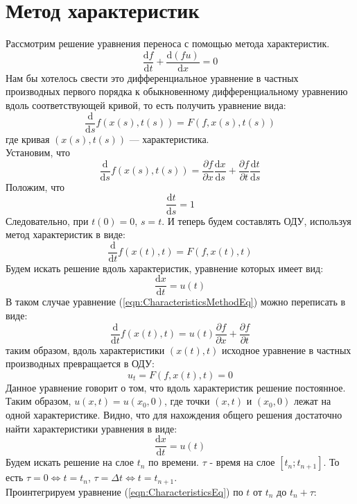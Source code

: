 \documentclass[10pt,a4paper]{article}
\begin{document}
\section{Метод характеристик}
\begin{comment}
https://ru.wikipedia.org/wiki/%
\end{comment}
Рассмотрим решение уравнения переноса с помощью метода характеристик.
\begin{equation}
\frac{\text{d}f}{\text{d}t} + \frac{\text{d}(f u)}{\text{d}x}=0
\end{equation}
Нам бы хотелось свести это дифференциальное уравнение в частных производных первого порядка к обыкновенному дифференциальному уравнению вдоль соответствующей кривой, то есть получить уравнение вида:
\[
\frac{\text{d}}{\text{d}s}f(x(s),t(s))=F(f,x(s),t(s))
\]
где кривая $(x(s),t(s))$ — характеристика.\\
Установим, что
\begin{equation}
\label{eqn:CharacteristicsMethodEq}
\frac{\text{d}}{\text{d}s}f(x(s),t(s))=\frac{\partial f}{\partial x}\frac{\text{d}x}{\text{d}s}+\frac{\partial f}{\partial t}\frac{\text{d}t}{\text{d}s}
\end{equation}
Положим, что
\[
\frac{\text{d}t}{\text{d}s}=1
\]
Следовательно, при $t(0)=0$, $s=t$. И теперь будем составлять ОДУ, используя метод характеристик в виде:
\[
\frac{\text{d}}{\text{d}t}f(x(t),t)=F(f,x(t),t)
\]
Будем искать решение вдоль характеристик, уравнение которых имеет вид:
\[
\frac{\text{d}x}{\text{d}t}=u(t)
\]
В таком случае уравнение (\ref{eqn:CharacteristicsMethodEq}) можно переписать в виде:
\[
\frac{\text{d}}{\text{d}t}f(x(t),t)=u(t)\frac{\partial f}{\partial x}+\frac{\partial f}{\partial t}
\]
таким образом, вдоль характеристики $(x(t),t)$ исходное уравнение в частных производных превращается в ОДУ:
\[
u_t=F(f,x(t),t)=0
\]
Данное уравнение говорит о том, что вдоль характеристик решение постоянное. Таким образом, $u(x,t)=u(x_0,0)$, где точки $(x,t)$ и $(x_0,0)$ лежат на одной характеристике. Видно, что для нахождения общего решения достаточно найти характеристики уравнения в виде:
\begin{equation}
\label{eqn:CharacteristicsEq}
\frac{\text{d}x}{\text{d}t}=u(t)
\end{equation}
Будем искать решение на слое $t_n$ по времени. $\tau$ - время на слое $[t_n; t_{n+1}]$. То есть $\tau=0 \Leftrightarrow t=t_n$, $\tau=\Delta t \Leftrightarrow t=t_{n+1}$.
\\Проинтегрируем уравнение (\ref{eqn:CharacteristicsEq}) по $t$ от $t_n$ до $t_n+\tau$:
\end{document}
